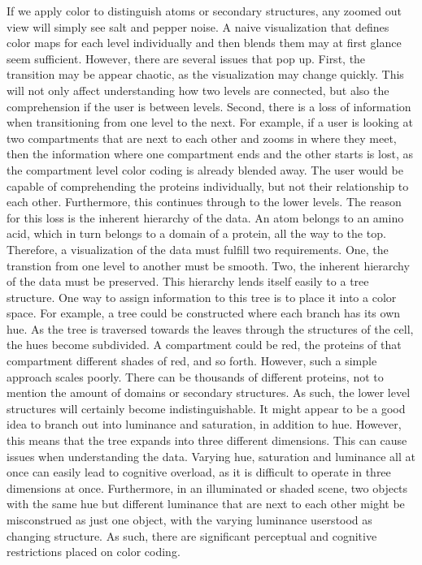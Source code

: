 \documentclass[review,journal]{vgtc}         %
\begin{document}
If we apply color to distinguish atoms or secondary structures, any zoomed out view will simply see salt and pepper noise. 
A naive visualization that defines color maps for each level individually and then blends them may at first glance seem sufficient.
However, there are several issues that pop up.
First, the transition may be appear chaotic, as the visualization may change quickly.
This will not only affect understanding how two levels are connected, but also the comprehension if the user is between levels.
Second, there is a loss of information when transitioning from one level to the next. 
For example, if a user is looking at two compartments that are next to each other and zooms in where they meet, then the information where one compartment ends and the other starts is lost, as the compartment level color coding is already blended away. 
The user would be capable of comprehending the proteins individually, but not their relationship to each other.
Furthermore, this continues through to the lower levels. 
The reason for this loss is the inherent hierarchy of the data.
An atom belongs to an amino acid, which in turn belongs to a domain of a protein, all the way to the top.
Therefore, a visualization of the data must fulfill two requirements. 
One, the transtion from one level to another must be smooth.
Two, the inherent hierarchy of the data must be preserved.
This hierarchy lends itself easily to a tree structure.
One way to assign information to this tree is to place it into a color space.
For example, a tree could be constructed where each branch has its own hue.
As the tree is traversed towards the leaves through the structures of the cell, the hues become subdivided.
A compartment could be red, the proteins of that compartment different shades of red, and so forth.
However, such a simple approach scales poorly. 
There can be thousands of different proteins, not to mention the amount of domains or secondary structures.
As such, the lower level structures will certainly become indistinguishable.
It might appear to be a good idea to branch out into luminance and saturation, in addition to hue.
However, this means that the tree expands into three different dimensions.
This can cause issues when understanding the data.
Varying hue, saturation and luminance all at once can easily lead to cognitive overload, as it is difficult to operate in three dimensions at once. 
Furthermore, in an illuminated or shaded scene, two objects with the same hue but different luminance that are next to each other might be misconstrued as just one object, with the varying luminance userstood as changing structure. 
As such, there are significant perceptual and cognitive restrictions placed on color coding. 
\end{document}
